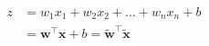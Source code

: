 \documentclass[preview]{standalone}
\begin{document}
\begin{align}
z &= w_1 x_1 + w_2 x_2 + \dots + w_n x_n + b \\ &= \mathbf{w}^\top \mathbf{x} + b = \tilde{\mathbf{w}}^\top \tilde{\mathbf{x}}
\end{align}
\end{document}
